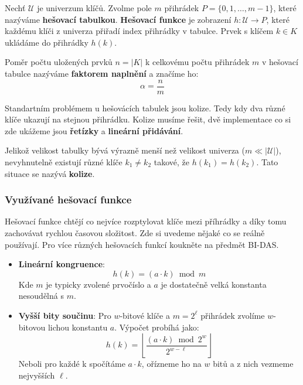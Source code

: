 \bigskip

\begin{definition}
Nechť $\mathcal{U}$ je univerzum klíčů. Zvolme pole $m$ přihrádek $P = \{0, 1, \dots, m-1\}$, které nazýváme \textbf{hešovací tabulkou}. \textbf{Hešovací funkce} je zobrazení $h: \mathcal{U} \to P$, které každému klíči z univerza přiřadí index přihrádky v tabulce. Prvek s klíčem $k \in K$ ukládáme do přihrádky $h(k)$.
\end{definition}

\medskip

\begin{definition}
Poměr počtu uložených prvků $n = |K|$ k celkovému počtu přihrádek $m$ v hešovací tabulce nazýváme \textbf{faktorem naplnění} a značíme ho:
$$\alpha = \frac{n}{m}$$
\end{definition}

\medskip

\noindent Standartním problémem u hešovácích tabulek jsou kolize. Tedy kdy dva různé klíče ukazují na stejnou přihrádku. Kolize musíme řešit, dvě implementace co si zde ukážeme jsou \textbf{řetízky} a \textbf{lineární přidávání}.

\medskip

\begin{definition}[Kolize]
Jelikož velikost tabulky bývá výrazně menší než velikost univerza ($m \ll |\mathcal{U}|$), nevyhnutelně existují různé klíče $k_1 \neq k_2$ takové, že $h(k_1) = h(k_2)$. Tato situace se nazývá \textbf{kolize}.
\end{definition}



\subsubsection{Využívané hešovací funkce}

Hešovací funkce chtějí co nejvíce rozptylovat klíče mezi příhrádky a díky tomu zachovávat rychlou časovou složitost. Zde si uvedeme nějaké co se reálně používají. Pro více různých hešovacích funkcí koukněte na předmět BI-DAS.

\begin{itemize}
    \item \textbf{Lineární kongruence}:
    $$h(k) = (a \cdot k) \bmod m$$
    Kde $m$ je typicky zvolené prvočíslo a $a$ je dostatečně velká konstanta nesoudělná s $m$.
    
    \item \textbf{Vyšší bity součinu}:
    Pro $w$-bitové klíče a $m = 2^\ell$ přihrádek zvolíme $w$-bitovou lichou konstantu $a$. Výpočet probíhá jako:
    $$h(k) = \left\lfloor \frac{(a \cdot k) \bmod 2^w}{2^{w-\ell}} \right\rfloor$$
    Neboli pro každé k spočítáme $a \cdot k$, ořízneme ho na $w$ bitů a z nich
    vezmeme nejvyšších $\ell$.
\end{itemize}


